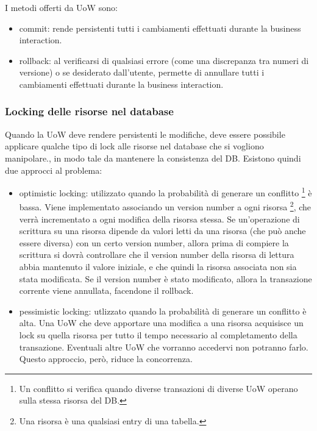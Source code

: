 I metodi offerti da UoW sono:
\begin{itemize}
    \item commit: rende persistenti tutti i cambiamenti effettuati durante la business interaction.
    \item rollback: al verificarsi di qualsiasi errore (come una discrepanza tra numeri di versione) o se desiderato dall'utente, permette di annullare tutti i cambiamenti effettuati durante la business interaction.
\end{itemize}

\subsubsection{Locking delle risorse nel database}
Quando la UoW deve rendere persistenti le modifiche, deve essere possibile applicare qualche tipo di lock alle risorse nel database che si vogliono manipolare., in modo tale da mantenere la consistenza del DB.
Esistono quindi due approcci al problema:
\begin{itemize}
    \item optimistic locking: utilizzato quando la probabilità di generare un conflitto \footnote{Un conflitto si verifica quando diverse transazioni di diverse UoW operano sulla stessa risorsa del DB.} è bassa. Viene implementato associando un version number a ogni risorsa \footnote{Una risorsa è una qualsiasi entry di una tabella.}, che verrà incrementato a ogni modifica della risorsa stessa.
    Se un'operazione di scrittura su una risorsa dipende da valori letti da una risorsa (che può anche essere diversa) con un certo version number, allora prima di compiere la scrittura si dovrà controllare che il version number della risorsa di lettura abbia mantenuto il valore iniziale, e che quindi la risorsa associata non sia stata modificata. Se il version number è stato modificato, allora la transazione corrente viene annullata, facendone il rollback.
    \item pessimistic locking: utlizzato quando la probabilità di generare un conflitto è alta. Una UoW che deve apportare una modifica a una risorsa acquisisce un lock su quella risorsa per tutto il tempo necessario al completamento della transazione. Eventuali altre UoW che vorranno accedervi non potranno farlo. Questo approccio, però, riduce la concorrenza.
\end{itemize}

